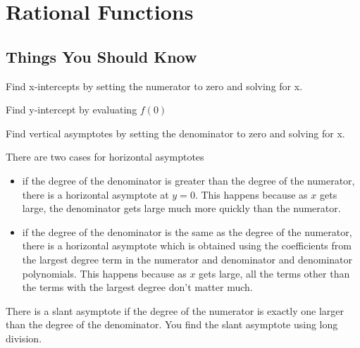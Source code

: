 \documentclass[fleqn,addpoints]{exam}
\begin{document}
\section{Rational Functions}
\subsection{Things You Should Know}

\begin{itemize*}
\item Find x-intercepts by setting the numerator to zero and solving for x.
\item Find y-intercept by evaluating $f(0)$
\item Find vertical asymptotes by setting the denominator to zero and solving for x.
\item There are two cases for horizontal asymptotes
\begin{itemize}
  \item if the degree of the denominator is greater than the degree of the numerator, there is a horizontal asymptote at
    $y=0$.  This happens because as $x$ gets large, the denominator gets large much more quickly than the numerator.

  \item if the degree of the denominator is the same as the degree of the numerator, there is a horizontal asymptote
    which is obtained using the coefficients from the largest degree term in the numerator and denominator and
    denominator polynomials.  This happens because as $x$ gets large, all the terms other than the terms with the
    largest degree don't matter much.
\end{itemize}

\item There is a slant asymptote if the degree of the numerator is exactly one larger than the degree of the
  denominator.  You find the slant asymptote using long division.

\end{itemize*}
\end{document}
